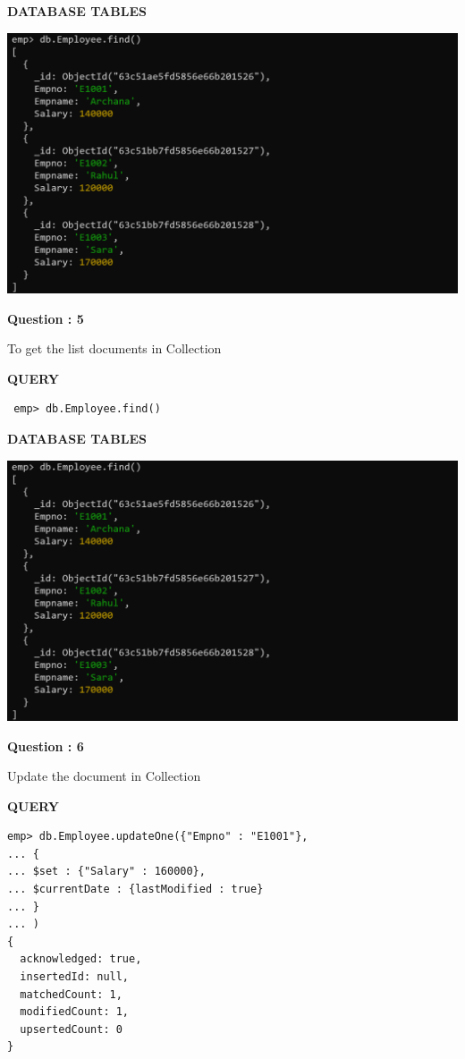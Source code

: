 \documentclass[a4paper,12pt]{report}
\begin{document}
\newpage
\begin{flushleft}
\textbf{DATABASE TABLES}
\end{flushleft}
\includegraphics[scale=0.5]{M4.2.png}
\begin{flushleft}
    \textbf{Question : 5}
\end{flushleft}
To get the list documents in Collection
\begin{flushleft}
\textbf{QUERY }
\end{flushleft}
 \begin{verbatim}
 emp> db.Employee.find()
\end{verbatim}
\begin{flushleft}
\textbf{DATABASE TABLES}
\end{flushleft}
\includegraphics[scale=0.5]{M4.2.png}
\begin{flushleft}
    \textbf{Question : 6}
\end{flushleft}
Update the document in Collection
\begin{flushleft}
\textbf{QUERY }
\end{flushleft}
 \begin{verbatim}
emp> db.Employee.updateOne({"Empno" : "E1001"},
... {
... $set : {"Salary" : 160000},
... $currentDate : {lastModified : true}
... }
... )
{
  acknowledged: true,
  insertedId: null,
  matchedCount: 1,
  modifiedCount: 1,
  upsertedCount: 0
}
\end{verbatim}
\end{document}
